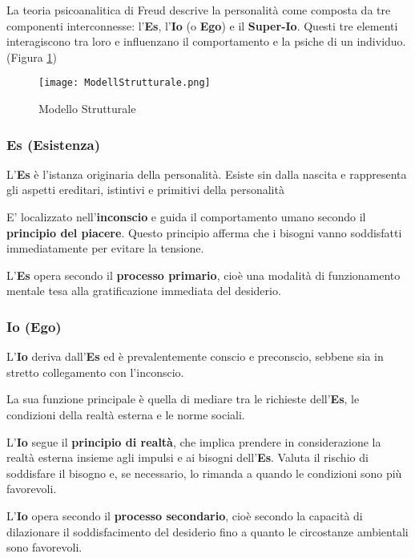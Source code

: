 \documentclass{subfiles}
\begin{document}
La teoria psicoanalitica di Freud descrive la personalità come composta da tre componenti 
interconnesse: l'\textbf{Es}, l'\textbf{Io} (o \textbf{Ego}) e il \textbf{Super-Io}. 
Questi tre elementi interagiscono tra loro e influenzano il comportamento e la 
psiche di un individuo. (Figura \ref{Modello Strutturale})


\begin{figure}[ht]
    \centering
    \texttt{[image: ModellStrutturale.png]}
    \caption{Modello Strutturale}
    \label{Modello Strutturale}
\end{figure}

\subsubsection{Es (Esistenza)}
L'\textbf{Es} è l'istanza originaria della personalità. Esiste sin dalla nascita e rappresenta 
gli aspetti ereditari, istintivi e primitivi della personalità

E' localizzato nell'\textbf{inconscio} e guida il comportamento umano secondo il 
\textbf{principio del piacere}. Questo principio afferma che i bisogni vanno soddisfatti 
immediatamente per evitare la tensione.

L'\textbf{Es} opera secondo il \textbf{processo primario}, cioè una modalità di funzionamento 
mentale tesa alla gratificazione immediata del desiderio.\\

\subsubsection{Io (Ego)}
L'\textbf{Io} deriva dall'\textbf{Es} ed è prevalentemente conscio e preconscio, sebbene sia 
in stretto collegamento con l'inconscio.

La sua funzione principale è quella di mediare tra le richieste dell'\textbf{Es}, le condizioni 
della realtà esterna e le norme sociali.

L'\textbf{Io} segue il \textbf{principio di realtà}, che implica prendere in considerazione la 
realtà esterna insieme agli impulsi e ai bisogni dell'\textbf{Es}. Valuta il rischio di 
soddisfare il bisogno e, se necessario, lo rimanda a quando le condizioni sono più favorevoli.

L'\textbf{Io} opera secondo il \textbf{processo secondario}, cioè secondo la capacità di 
dilazionare il soddisfacimento del desiderio fino a quanto le circostanze ambientali sono 
favorevoli.\\
\end{document}
